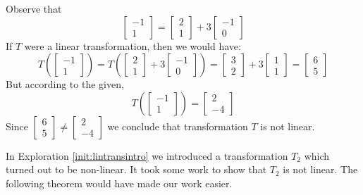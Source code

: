 \documentclass{ximera}
\begin{document}
\begin{example}
\begin{explanation} Observe that
$$\begin{bmatrix}
-1\\
1
\end{bmatrix}=\begin{bmatrix}
2\\
1
\end{bmatrix}+3\begin{bmatrix}
-1\\
0
\end{bmatrix}$$
If $T$ were a linear transformation, then we would have: $$T\left(\begin{bmatrix}
-1\\
1
\end{bmatrix}\right)=T\left(\begin{bmatrix}
2\\
1
\end{bmatrix}+3\begin{bmatrix}
-1\\
0
\end{bmatrix}\right)=\begin{bmatrix}
3\\
2
\end{bmatrix}+3\begin{bmatrix}
1\\
1
\end{bmatrix}=\begin{bmatrix}
6\\
5
\end{bmatrix}$$
But according to the given,
$$T\left(\begin{bmatrix}-1\\1\end{bmatrix}\right)=\begin{bmatrix}2\\-4\end{bmatrix}$$
Since $\begin{bmatrix}
6\\
5
\end{bmatrix}\neq \begin{bmatrix}
2\\
-4
\end{bmatrix}$
we conclude that transformation $T$ is not linear.
\end{explanation}
\end{example}

In Exploration \ref{init:lintransintro} we introduced a transformation $T_2$ which turned out to be non-linear.  It took some work to show that $T_2$ is not linear.  The following theorem would have made our work easier.
\end{document}
